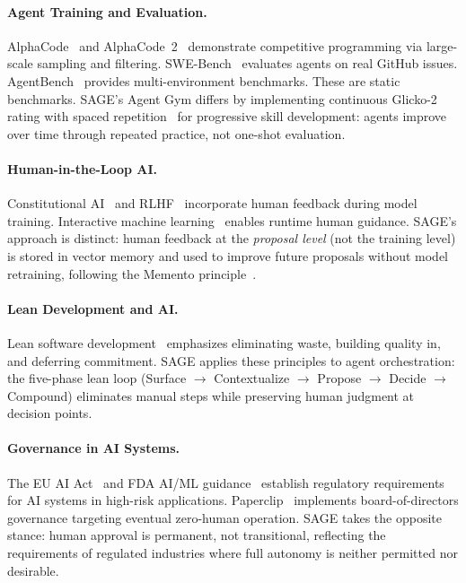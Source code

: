 \documentclass[11pt,a4paper]{article}
\begin{document}
\paragraph{Agent Training and Evaluation.}
AlphaCode~\citep{li2022alphacode} and AlphaCode~2~\citep{leblond2023alphacode2} demonstrate competitive programming via large-scale sampling and filtering. SWE-Bench~\citep{jimenez2024swebench} evaluates agents on real GitHub issues. AgentBench~\citep{liu2023agentbench} provides multi-environment benchmarks. These are static benchmarks. SAGE's Agent Gym differs by implementing continuous Glicko-2~\citep{glickman2001glicko2} rating with spaced repetition~\citep{leitner1972} for progressive skill development: agents improve over time through repeated practice, not one-shot evaluation.

\paragraph{Human-in-the-Loop AI.}
Constitutional AI~\citep{bai2022constitutional} and RLHF~\citep{ouyang2022rlhf} incorporate human feedback during model training. Interactive machine learning~\citep{amershi2014power} enables runtime human guidance. SAGE's approach is distinct: human feedback at the \textit{proposal level} (not the training level) is stored in vector memory and used to improve future proposals without model retraining, following the Memento principle~\citep{memento2025}.

\paragraph{Lean Development and AI.}
Lean software development~\citep{poppendieck2003lean} emphasizes eliminating waste, building quality in, and deferring commitment. SAGE applies these principles to agent orchestration: the five-phase lean loop (Surface $\rightarrow$ Contextualize $\rightarrow$ Propose $\rightarrow$ Decide $\rightarrow$ Compound) eliminates manual steps while preserving human judgment at decision points.

\paragraph{Governance in AI Systems.}
The EU AI Act~\citep{euaiact2024} and FDA AI/ML guidance~\citep{fdaaiml2023} establish regulatory requirements for AI systems in high-risk applications. Paperclip~\citep{paperclip2024} implements board-of-directors governance targeting eventual zero-human operation. SAGE takes the opposite stance: human approval is permanent, not transitional, reflecting the requirements of regulated industries where full autonomy is neither permitted nor desirable.
\end{document}
